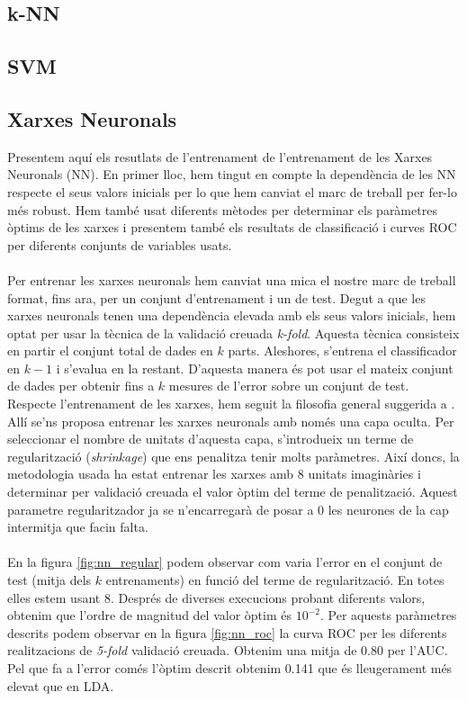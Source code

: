 \documentclass[a4paper,10pt]{article}
\begin{document}
\subsection{k-NN}
\subsection{SVM}

\subsection{Xarxes Neuronals}
Presentem aquí els resutlats de l'entrenament de l'entrenament de les Xarxes Neuronals (NN). En primer lloc, hem tingut en compte la dependència de les NN respecte el seus valors inicials per lo que hem canviat el marc de treball per fer-lo més robust. Hem també  usat diferents mètodes per determinar els paràmetres òptims de les xarxes i presentem també els resultats de classificació i curves ROC per diferents conjunts de variables usats.
\\
\\
Per entrenar les xarxes neuronals hem canviat una mica el nostre marc de treball format, fins ara, per un conjunt d'entrenament i un de test. Degut a que les xarxes neuronals tenen una dependència elevada amb els seus valors inicials, hem optat per usar la tècnica de la validació creuada \textit{k-fold}. Aquesta tècnica consisteix en partir el conjunt total de dades en $k$ parts. Aleshores, s'entrena el classificador en $k-1$ i s'evalua en la restant. D'aquesta manera és pot usar el mateix conjunt de dades per obtenir fins a $k$ mesures de l'error sobre un conjunt de test. Respecte l'entrenament de les xarxes, hem seguit la filosofia general suggerida a \cite{hastie09}. Allí se'ns proposa entrenar les xarxes neuronals amb només una capa oculta. Per seleccionar el nombre de unitats d'aquesta capa, s'introdueix un terme de regularització (\textit{shrinkage}) que ens penalitza tenir molts paràmetres. Així doncs, la metodologia usada ha estat entrenar les xarxes amb 8 unitats imaginàries i determinar per validació creuada el valor òptim del terme de penalització. Aquest parametre regularitzador ja se n'encarregarà de posar a 0 les neurones de la cap intermitja que facin falta. 
\\
\\
En la figura \ref{fig:nn_regular} podem observar com varia l'error en el conjunt de test (mitja dels $k$ entrenaments) en funció del terme de regularització. En totes elles estem usant 8. Després de diverses execucions probant diferents valors, obtenim que l'ordre de magnitud del valor òptim és $10^{-2}$. Per aquests paràmetres descrits podem observar en la figura \ref{fig:nn_roc} la curva ROC per les diferents realitzacions de \textit{5-fold} validació creuada. Obtenim una mitja de 0.80 per l'AUC. Pel que fa a l'error comés l'òptim descrit obtenim 0.141 que és lleugerament més elevat que en LDA. 
\end{document}
